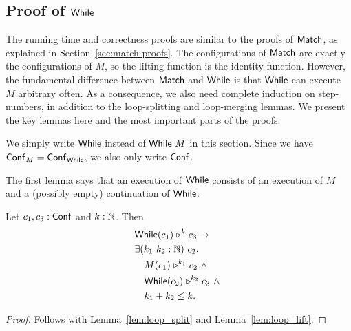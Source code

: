 \subsection{Proof of $\mathsf{While}$}
\label{sec:while-proofs}

The running time and correctness proofs are similar to the proofs of $\mathsf{Match}$, as explained in Section~\ref{sec:match-proofs}.  The configurations of
$\mathsf{Match}$ are exactly the configurations of $M$, so the lifting function is the identity function.  However, the fundamental difference between
$\mathsf{Match}$ and $\mathsf{While}$ is that $\mathsf{While}$ can execute $M$ arbitrary often.  As a consequence, we also need complete induction on step-numbers, in
addition to the loop-splitting and loop-merging lemmas.  We present the key lemmas here and the most important parts of the proofs.

We simply write $\mathsf{While}$ instead of $\mathsf{While}~M$ in this section.  Since we have $\mathsf{Conf}_M = \mathsf{Conf}_{\mathsf{While}}$, we also only write $\mathsf{Conf}$.

The first lemma says that an execution of $\mathsf{While}$ consists of an execution of $M$ and a (possibly empty) continuation of $\mathsf{While}$:
\begin{lemma}
  \label{lem:While_split}
  Let $c_1, c_3 : \mathsf{Conf}$ and $k:\mathbb{N}$.  Then
  \begin{alignat*}{1}
    & \mathsf{While}(c_1) \mathrel{\triangleright}^k c_3 \rightarrow \\
    & \exists (k_1~k_2 : \mathbb{N})~c_2. \\
    & \quad M(c_1) \mathrel{\triangleright}^{k_1} c_2 ~\land~ \\
    & \quad \mathsf{While}(c_2) \mathrel{\triangleright}^{k_2} c_3 ~\land~\\
    & \quad k_1 + k_2 \leq k.
  \end{alignat*}
\end{lemma}
\begin{proof}
  Follows with Lemma~\ref{lem:loop_split} and Lemma~\ref{lem:loop_lift}.
\end{proof}

